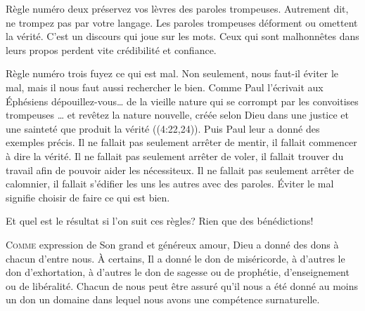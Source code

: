 Règle numéro deux\frcolon{} préservez vos lèvres des paroles trompeuses.
 Autrement dit, ne trompez pas par votre langage. Les paroles trompeuses
 déforment ou omettent la vérité. C'est un discours qui joue sur les mots.
 Ceux qui sont malhonnêtes dans leurs propos perdent vite
 crédibilité et confiance.


Règle numéro trois\frcolon{} fuyez ce qui est mal.
 Non seulement, nous faut-il éviter le mal, mais il nous faut aussi rechercher
 le bien. Comme Paul l'écrivait aux Éphésiens\frcolon{} 
 \Og dépouillez-vous\dots{} de la vieille nature qui se corrompt
 par les convoitises trompeuses 
 \dots{} et revêtez la nature nouvelle, créée selon Dieu dans une justice
 et une sainteté que produit la vérité \Fg{} 
 ((4:22,24)).
 Puis Paul leur a donné des exemples précis.
 Il ne fallait pas seulement arrêter de mentir,
 il fallait commencer à dire la vérité. Il ne fallait pas seulement arrêter
 de voler, il fallait trouver du travail afin de pouvoir aider les nécessiteux.
 Il ne fallait pas seulement arrêter de calomnier, il fallait s'édifier
 les uns les autres avec des paroles. Éviter le mal signifie choisir
 de faire ce qui est bien.

Et quel est le résultat si l'on suit ces règles? Rien que des bénédictions!

\dvrule






\lettrine{C}{omme} expression de Son grand et généreux amour,
 Dieu a donné des dons à chacun d'entre nous.
 À certains, Il a donné le don de miséricorde, à d'autres le don d'exhortation,
 à d'autres le don de sagesse ou de prophétie, d'enseignement ou de libéralité.
 Chacun de nous peut être assuré qu'il nous a été donné au moins un don
 \ocadr un domaine dans lequel nous avons une compétence surnaturelle.

